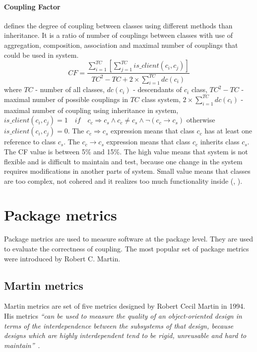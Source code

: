 \paragraph{Coupling Factor} defines the degree of coupling between classes using different methods than inheritance. It is a ratio of number of couplings between classes with use of aggregation, composition, association and maximal number of couplings that could be used in system.  
\begin{equation}
CF=\frac { \sum _{ i=1 }^{ TC }{ \left[ \sum _{ j=1 }^{ TC }{ is\_ client\left( { c }_{ i },{ c }_{ j } \right)  }  \right]  }  }{ { TC }^{ 2 }-TC+2\times \sum _{ i=1 }^{ TC }{ dc({ c }_{ i }) }  } 
\end{equation}	
where $TC$ - number of all classes, $dc(c_{i})$ - descendants of $c_{i}$ class, ${TC}^{2}-TC$ - maximal number of possible couplings in $TC$ class system, $2\times \sum _{ i=1 }^{ TC }{ dc({ c }_{ i }) }$ - maximal number of coupling using inheritance in system,  $is\_ client\left( { c }_{ i },{ c }_{ j } \right) = 1\quad if\quad { c }_{ c }\Rightarrow { c }_{ s }\wedge { c }_{ c }\neq { c }_{ s }\wedge \neg \left( { c }_{ c }{ \rightarrow c }_{ s } \right) $ otherwise $is\_ client\left( { c }_{ i },{ c }_{ j } \right) =0$. The ${ c }_{ c }\Rightarrow { c }_{ s }$ expression means that class $c_{c}$ has at least one reference to class $c_{s}$. The ${ c }_{ c }{ \rightarrow c }_{ s }$ expression means that  class $c_{c}$ inherits class $c_{s}$. The \ac{CF} value is between 5\% and 15\%. The high value means that system is not flexible and is difficult to maintain and test, because one change in the system requires modifications in another parts of system. Small value means that classes are too complex, not cohered and it realizes too much functionality inside (\cite{moodbook}, \cite{nasa}).  
\section{Package metrics}

Package metrics are used to measure software at the package level. They are used to evaluate the correctness of coupling. The most popular set of package metrics were introduced by Robert C. Martin.

\subsection{Martin metrics}
Martin metrics are set of five metrics designed by Robert Cecil Martin in 1994. His metrics \textit{``can be used to measure the quality of an object-oriented design in terms of the interdependence between the subsystems of that design, because designs which are highly interdependent tend to be rigid, unreusable and hard to maintain''}~\cite{martin}.

